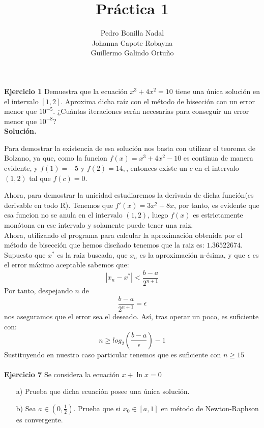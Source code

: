 \documentclass[11pt]{article}
\title{\textbf{Práctica 1}}
\author{Pedro Bonilla Nadal\\
		Johanna Capote Robayna\\
		Guillermo Galindo Ortuño}
\date{}
\begin{document}
\maketitle

\textbf{Ejercicio 1}
Demuestra que la ecuaci\'on $x^3 + 4x^2 = 10 $ tiene una \'unica soluci\'on en el intervalo $ [1,2] $. Aproxima dicha ra\'iz con el m\'etodo de bisecci\'on con un error menor que $10^{-5}$. ¿Cu\'antas iteraciones ser\'an necesarias para conseguir un error menor que $10^{-8}$?
\\

\textbf{Solución.}

Para demostrar la existencia de esa solución nos basta con utilizar el teorema de Bolzano, ya que, como la funcion $f(x)=x^3 +4x^2 -10$ es continua de manera evidente, y $f(1) = -5$ y $f(2) =  14,$, entonces existe un $c$ en el intervalo $(1,2)$ tal que $f(c) = 0$.

Ahora, para demostrar la unicidad estudiaremos la derivada de dicha función(es derivable en todo
 R). Tenemos que $f'(x) = 3x^2 +8x$, por tanto, es evidente que esa funcion no se anula en el intervalo $(1,2)$, luego $f(x)$ es estrictamente monótona en ese intervalo y solamente puede tener una raiz.
\\

Ahora, utilizando el programa para calcular la aproximación obtenida por el método de bisección que hemos diseñado tenemos que la raiz es: $1.36522674$.
\\

Supuesto que $x^*$ es la raiz buscada, que $x_n$ es la aproximación n-ésima, y que $\epsilon$ es el error máximo aceptable sabemos que:
$$|x_n - x^*| < \frac{b-a}{2^{n+1}}$$
Por tanto, despejando $n$ de
$$\frac{b-a}{2^{n+1}} = \epsilon$$
nos aseguramos que el error sea el deseado. Así, tras operar un poco, es suficiente con:
$$ n \geq log_2(\frac{b-a}{\epsilon})-1$$
Sustituyendo en nuestro caso particular tenemos que es suficiente con $n \geq 15$
\\ \\

\textbf{Ejercicio 7}
Se considera la ecuaci\'on $x + \ln x = 0$
\begin{itemize}
\item[a)]Prueba que dicha ecuaci\'on posee una \'unica soluci\'on.
\item[b)] Sea $a \in (0, \frac{1}{2})$. Prueba que  si $x_0 \in [a,1]$ en m\'etodo de Newton-Raphson es convergente.
\end{itemize}
\end{document}
